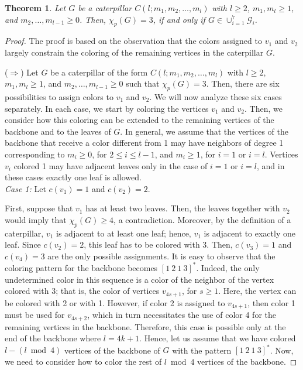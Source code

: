 \documentclass{article}
\newtheorem{theorem}{Theorem}
\begin{document}
\begin{theorem} \label{thm:caterpillar}
Let $G$ be a caterpillar $C(l;m_1,m_2,\ldots,m_l)$ with $l\geq 2$, $m_1,m_l \geq 1$, and $m_2,\ldots,m_{l-1}\geq 0$. Then, $\chi_p(G)=3$, if and only if $G \in \cup_{i=1}^{7}\mathcal{G}_i$. 

\end{theorem}
\begin{proof}
    The proof is based on the observation that the colors assigned to $v_1$ and $v_2$ largely constrain the coloring of the remaining vertices in the caterpillar $G$.

 ($\Rightarrow$) Let $G$ be a caterpillar of the form $C(l;m_1,m_2,\ldots,m_l)$ with $l\geq 2$, $m_1,m_l \geq 1$, and $m_2,\ldots,m_{l-1}\geq 0$ such that $\chi_p(G)=3$. Then, there are six possibilities to assign colors to $v_1$ and $v_2$. We will now analyze these six cases separately. In each case, we start by coloring the vertices $v_1$ and $v_2$. Then, we consider how this coloring can be extended to the remaining vertices of the backbone and to the leaves of $G$. In general, we assume that the vertices of the backbone that receive a color different from 1 may have neighbors of degree 1 corresponding to $m_i \geq 0$, for $2\leq i\leq l-1$, and $m_i \geq 1$, for $i=1$ or $i=l$. Vertices $v_i$ colored 1 may have adjacent leaves only in the case of $i=1$ or $i=l$, and in these cases exactly one leaf is allowed.
~~\\

\emph{Case 1:} Let $c(v_1)=1$ and  $c(v_2)=2$. 

First, suppose that $v_1$ has at least two leaves. Then, the leaves together with $v_2$ would imply that $\chi_p(G) \ge 4$, a contradiction. Moreover, by the definition of a caterpillar, $v_1$ is adjacent to at least one leaf; hence, $v_1$ is adjacent to exactly one leaf. Since $c(v_2)=2$, this leaf has to be colored with $3$. Then, $c(v_3)=1$ and $c(v_4)=3$ are the only possible assignments. It is easy to observe that the coloring pattern for the backbone becomes $[1\ 2\ 1\ 3]^{*}$. 
Indeed, the only undetermined color in this sequence is a color of the neighbor of the vertex colored with 3; that is, the color of vertices $v_{4s+1}$, for $s\geq 1$. Here, the vertex can be colored with 2 or with 1. However, if color 2 is assigned to $v_{4s+1}$, then color 1 must be used for $v_{4s+2}$, which in turn necessitates the use of color 4 for the remaining vertices in the backbone. Therefore, this case is possible only at the end of the backbone where $l=4k+1$.
Hence, let us assume that we have colored $l - (l \bmod 4)$ vertices of the backbone of $G$ with the pattern $[1\ 2\ 1\ 3]^{*}$. Now, we need to consider how to color the rest of $l \bmod 4$ vertices of the backbone. 


\end{proof}
\end{document}
